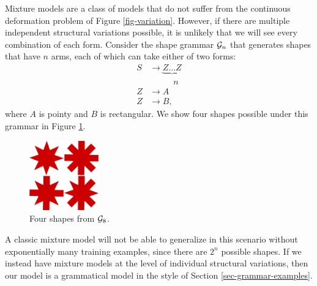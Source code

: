 Mixture models are a class of models that do not suffer from the
continuous deformation problem of Figure \ref{fig-variation}. However,
if there are multiple independent structural variations possible, it
is unlikely that we will see every combination of each form.  Consider
the shape grammar ${\mathcal G}_n$ that generates shapes that have $n$ arms,
each of which can take either of two forms:
\begin{align*}
S&\to \underbrace{Z\dots Z}\\
&\phantom{\to Z ..}n\\
Z &\to A\\
Z &\to B,
\end{align*}
where $A$ is pointy and $B$ is rectangular. We show four shapes
possible under this grammar in Figure \ref{fig-narms}. 
\begin{figure}[h]
\centering
\includegraphics[height=30mm]{images/narms.png} 
\caption{Four shapes from ${\mathcal G}_8$.}
\label{fig-narms}
\end{figure}
A classic mixture model will not be able to generalize in this
scenario without exponentially many training examples, since there
are $2^n$ possible shapes. If we instead have mixture models at the
level of individual structural variations, then our model is a
grammatical model in the style of Section \ref{sec-grammar-examples}.

